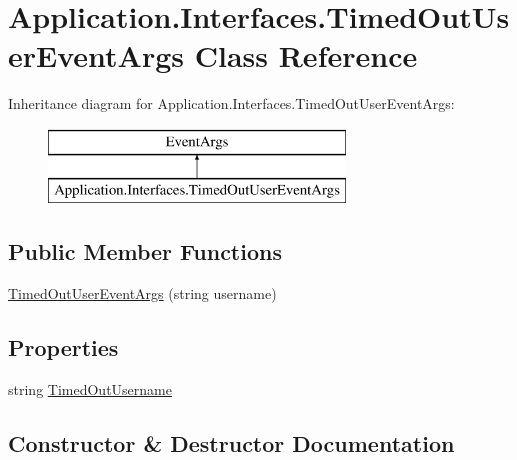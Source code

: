 \hypertarget{class_application_1_1_interfaces_1_1_timed_out_user_event_args}{}\section{Application.\+Interfaces.\+Timed\+Out\+User\+Event\+Args Class Reference}
\label{class_application_1_1_interfaces_1_1_timed_out_user_event_args}
Inheritance diagram for Application.\+Interfaces.\+Timed\+Out\+User\+Event\+Args\+:\begin{figure}[H]
\begin{center}
\leavevmode
\includegraphics[height=2.000000cm]{class_application_1_1_interfaces_1_1_timed_out_user_event_args}
\end{center}
\end{figure}
\subsection*{Public Member Functions}
\begin{DoxyCompactItemize}
\item 
\mbox{\hyperlink{class_application_1_1_interfaces_1_1_timed_out_user_event_args_ad70d0e4500f69bf4459ef76d86e5412d}{Timed\+Out\+User\+Event\+Args}} (string username)
\end{DoxyCompactItemize}
\subsection*{Properties}
\begin{DoxyCompactItemize}
\item 
string \mbox{\hyperlink{class_application_1_1_interfaces_1_1_timed_out_user_event_args_ad359e7a3cc388ea94e1332e9109cebf8}{Timed\+Out\+Username}}
\end{DoxyCompactItemize}


\subsection{Constructor \& Destructor Documentation}
\mbox{\label{class_application_1_1_interfaces_1_1_timed_out_user_event_args_ad70d0e4500f69bf4459ef76d86e5412d}} 
